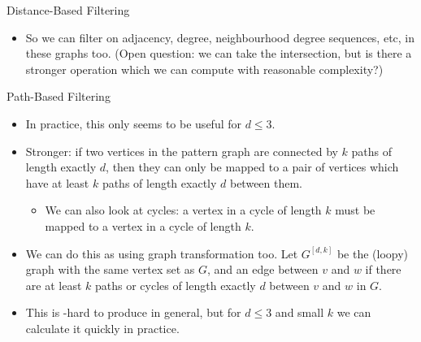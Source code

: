 \documentclass{beamer}
\begin{document}
\begin{frame}{Distance-Based Filtering}
{\begin{itemize}
            \item So we can filter on adjacency, degree, neighbourhood degree sequences, etc, in
                these graphs too.  (Open question: we can take the intersection, but is there a
                stronger operation which we can compute with reasonable complexity?)
        \end{itemize}
    }
\end{frame}

\begin{frame}{Path-Based Filtering}
    \begin{itemize}
        \item In practice, this only seems to be useful for $d \le 3$.

        \item Stronger: if two vertices in the pattern graph are connected by $k$ paths of
            length exactly $d$, then they can only be mapped to a pair of vertices which have at
            least $k$ paths of length exactly $d$ between them.

            \begin{itemize}
                \item We can also look at cycles: a vertex in a cycle of length $k$ must be mapped to a
                    vertex in a cycle of length $k$.
            \end{itemize}

        \item We can do this as using graph transformation too. Let $G^{\left[d, k\right]}$ be the
            (loopy) graph with the same vertex set as $G$, and an edge between $v$ and $w$ if there are at
            least $k$ paths or cycles of length exactly $d$ between $v$ and $w$ in $G$.

        \item This is \NP-hard to produce in general, but for $d \le 3$ and small $k$ we can
            calculate it quickly in practice.
    \end{itemize}
\end{frame}
\end{document}
